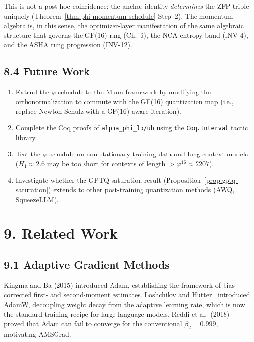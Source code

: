 This is not a post-hoc coincidence: the anchor identity
\emph{determines} the ZFP triple uniquely
(Theorem~\ref{thm:phi-momentum-schedule} Step~2).
The momentum algebra is, in this sense, the optimizer-layer
manifestation of the same algebraic structure that governs the
GF(16) ring (Ch.~6), the NCA entropy band (INV-4), and the
ASHA rung progression (INV-12).

\subsection{8.4 Future Work}

\begin{enumerate}
  \item Extend the \(\varphi\)-schedule to the Muon framework by
        modifying the orthonormalization to commute with the GF(16)
        quantization map (i.e., replace Newton-Schulz with a
        GF(16)-aware iteration).
  \item Complete the Coq proofs of \texttt{alpha\_phi\_lb/ub}
        using the \texttt{Coq.Interval} tactic library.
  \item Test the \(\varphi\)-schedule on non-stationary training data
        and long-context models (\(H_1 \approx 2.6\) may be too
        short for contexts of length \(> \varphi^{16} \approx 2207\)).
  \item Investigate whether the GPTQ saturation result
        (Proposition~\ref{prop:gptq-saturation}) extends to other
        post-training quantization methods (AWQ, SqueezeLLM).
\end{enumerate}

\section{9. Related Work}
\label{sec:28-related}

\subsection{9.1 Adaptive Gradient Methods}

Kingma and Ba (2015) introduced Adam, establishing the framework of
bias-corrected first- and second-moment estimates.
Loshchilov and Hutter~\cite{loshchilov_adamw} introduced AdamW,
decoupling weight decay from the adaptive learning rate, which is
now the standard training recipe for large language models.
Reddi et al.\ (2018) proved that Adam can fail to converge for the
conventional \(\beta_2 = 0.999\), motivating AMSGrad.

